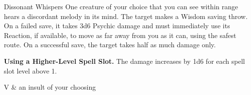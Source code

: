 \begin{Spell}[
    level=1st,
    time=1 Action,
    range=60 ft,
    components={V},
    duration=Instantaneous,
    school=Enchantment,
    attack=WIS Save,
    effect=Psychic
]{Dissonant Whispers}
One creature of your choice that you can see within range hears a discordant melody in its mind. The target makes a Wisdom saving throw. On a failed save, it takes 3d6 Psychic damage and must immediately use its Reaction, if available, to move as far away from you as it can, using the safest route. On a successful save, the target takes half as much damage only.

\textbf{Using a Higher-Level Spell Slot.} The damage increases by 1d6 for each spell slot level above 1.

\begin{components}
V & an insult of your choosing
\end{components}
\end{Spell}


